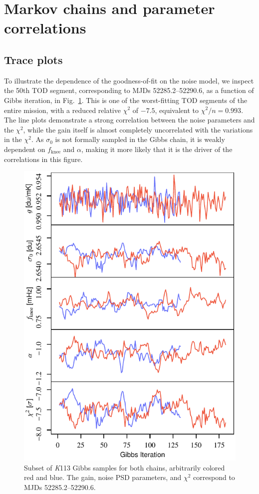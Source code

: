 \documentclass[twocolumn]{../../common/aa}
\newcommand{\K}[0]{\textit K}
\begin{document}
\section{Markov chains and parameter correlations}
\label{sec:markov}


\subsection{Trace plots}
\label{sec:traceplots}

To illustrate the dependence of the goodness-of-fit on the noise model,
we inspect the 50th TOD segment, corresponding to MJDs 52285.2--52290.6, as a
function of Gibbs iteration, in Fig.~\ref{fig:inst_K113_gibbs}. This is one of
the worst-fitting TOD segments of the entire mission, with a reduced relative
$\chi^2$ of $-7.5$, equivalent to $\chi^2/n=0.993$. The line plots demonstrate a strong correlation between the noise parameters and the $\chi^2$, while the gain itself is almost completely uncorrelated with the variations in the $\chi^2$. As $\sigma_0$ is not formally sampled in the Gibbs chain, it is weakly dependent on $f_\mathrm{knee}$ and $\alpha$, making it more likely that it is the driver of the correlations in this figure. 

\begin{figure}[t]
  	\centering
	\includegraphics[width=\linewidth]{figures/instpar_CG_K113_samples_v1.pdf}
	\caption{Subset of \K113 Gibbs samples for both chains, arbitrarily colored red and blue. The gain, noise PSD parameters, and $\chi^2$ correspond to MJDs 52285.2--52290.6.}
	\label{fig:inst_K113_gibbs}
\end{figure}
\end{document}
